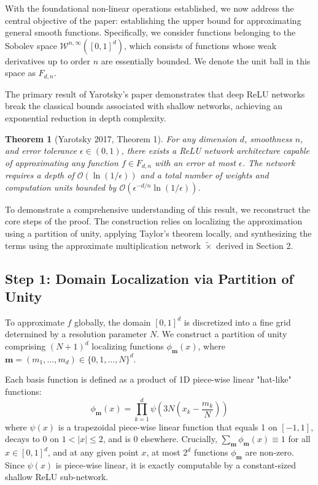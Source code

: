 \documentclass[12pt]{article}
\newtheorem{theorem}{Theorem}
\begin{document}
With the foundational non-linear operations established, we now address the central objective of the paper: establishing the upper bound for approximating general smooth functions. Specifically, we consider functions belonging to the Sobolev space $\mathcal{W}^{n,\infty}([0,1]^d)$, which consists of functions whose weak derivatives up to order $n$ are essentially bounded. We denote the unit ball in this space as $F_{d,n}$.

The primary result of Yarotsky's paper demonstrates that deep ReLU networks break the classical bounds associated with shallow networks, achieving an exponential reduction in depth complexity.

\begin{theorem}[Yarotsky 2017, Theorem 1]
For any dimension $d$, smoothness $n$, and error tolerance $\epsilon \in (0,1)$, there exists a ReLU network architecture capable of approximating any function $f \in F_{d,n}$ with an error at most $\epsilon$. The network requires a depth of $\mathcal{O}(\ln(1/\epsilon))$ and a total number of weights and computation units bounded by $\mathcal{O}(\epsilon^{-d/n} \ln(1/\epsilon))$.
\end{theorem}

To demonstrate a comprehensive understanding of this result, we reconstruct the core steps of the proof. The construction relies on localizing the approximation using a partition of unity, applying Taylor's theorem locally, and synthesizing the terms using the approximate multiplication network $\tilde{\times}$ derived in Section 2.

\subsection{Step 1: Domain Localization via Partition of Unity}
To approximate $f$ globally, the domain $[0,1]^d$ is discretized into a fine grid determined by a resolution parameter $N$. We construct a partition of unity comprising $(N+1)^d$ localizing functions $\phi_{\mathbf{m}}(x)$, where $\mathbf{m} = (m_1, \dots, m_d) \in \{0, 1, \dots, N\}^d$. 

Each basis function is defined as a product of 1D piece-wise linear "hat-like" functions:
\begin{equation}
\phi_{\mathbf{m}}(x) = \prod_{k=1}^d \psi\left(3N\left(x_k - \frac{m_k}{N}\right)\right)
\end{equation}
where $\psi(x)$ is a trapezoidal piece-wise linear function that equals 1 on $[-1, 1]$, decays to 0 on $1 < |x| \le 2$, and is 0 elsewhere. Crucially, $\sum_{\mathbf{m}} \phi_{\mathbf{m}}(x) \equiv 1$ for all $x \in [0,1]^d$, and at any given point $x$, at most $2^d$ functions $\phi_{\mathbf{m}}$ are non-zero. Since $\psi(x)$ is piece-wise linear, it is exactly computable by a constant-sized shallow ReLU sub-network.
\end{document}
